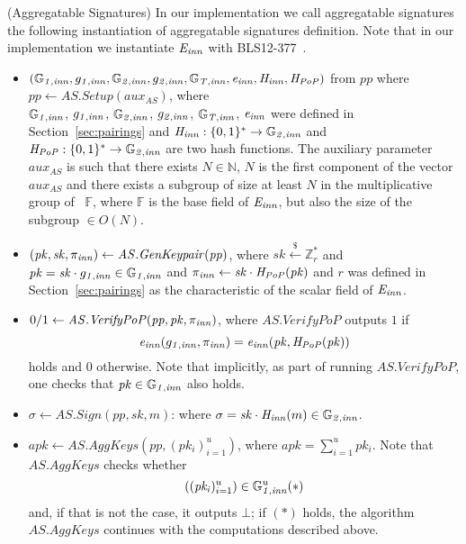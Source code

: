 \begin{construction}(Aggregatable Signatures) 
\label{insta:bls}
In our implementation we call aggregatable signatures the following 
instantiation of aggregatable signatures definition. Note that in our implementation we instantiate $\mathit{E}_{\mathit{inn}}$ with BLS12-377~\cite{zexe}.
\begin{itemize}
\item $(\mathbb{G}_{\mathit{1,inn}}, g_{\mathit{1,inn}}, \mathbb{G}_{\mathit{2,inn}}, g_{\mathit{2,inn}}, \mathbb{G}_{\mathit{T,inn}}, \mathit{e}_{\mathit{inn}}, \mathit{H}_{\mathit{inn}}, \mathit{H}_{\mathit{PoP}})$ from $\mathit{pp}$ where 
$\mathit{pp} \leftarrow  \mathit{AS.Setup}(\mathit{aux_{\mathit{AS}}})$, 
where \\ $\mathbb{G}_{\mathit{1,inn}}$, $g_{\mathit{1,inn}}$, $\mathbb{G}_{\mathit{2,inn}}$, $g_{\mathit{2,inn}}$, $\mathbb{G}_{\mathit{T,inn}}$, $\mathit{e}_{\mathit{inn}}$ were defined in Section~\ref{sec:pairings} and 
$\mathit{H}_{\mathit{inn}}: \{0,1\}^* \rightarrow \mathbb{G}_{\mathit{2,inn}}$ and $\mathit{H}_{\mathit{PoP}}: \{0,1\}^* \rightarrow \mathbb{G}_{\mathit{2,inn}}$ are two hash functions. 
The auxiliary parameter $\mathit{aux_{\mathit{AS}}}$ is such that there exists $N \in \mathbb{N}$, 
$N$ is the first component of the vector $\mathit{aux_{\mathit{AS}}}$ and there exists a subgroup of size at least $N$ in the multiplicative group 
of \ $\mathbb{F}$, where $\mathbb{F}$ is the base field of $\mathit{E}_{\mathit{inn}}$, but also the size of the subgroup $\in O(N)$.

\item $(\mathit{pk},\mathit{sk}, \pi_{\mathit{inn}}) \leftarrow \mathit{AS.GenKeypair}(\mathit{pp})$, where $\mathit{sk} \xleftarrow{\$} \mathbb{Z}_{r}^{*}$  
and $\mathit{pk} = \mathit{sk} \cdot g_{\mathit{1,inn}} \in \mathbb{G}_{\mathit{1,inn}}$ and $\pi_{\mathit{inn}} \leftarrow {\mathit{sk}} \cdot \mathit{H}_{\mathit{PoP}}(\mathit{pk})$ 
and $r$ was defined in Section~\ref{sec:pairings} as the characteristic of the scalar field of $\mathit{E}_{\mathit{inn}}$.

\item $0/1 \leftarrow \mathit{AS.VerifyPoP}(\mathit{pp}, \mathit{pk}, \pi_{\mathit{inn}})$, where $\mathit{AS.VerifyPoP}$ outputs $1$ if 
$$\mathit{e}_{\mathit{inn}}( g_{\mathit{1,inn}}, \pi_{\mathit{inn}}) = \mathit{e}_{\mathit{inn}}(\mathit{pk}, \mathit{H}_{\mathit{PoP}}(\mathit{pk}))$$ holds and $0$ otherwise. Note that implicitly, as part of running 
$\mathit{AS.VerifyPoP}$, one checks that $\mathit{pk} \in \mathbb{G}_{\mathit{1,inn}}$ also holds.

\item $\sigma \leftarrow \mathit{AS.Sign}(\mathit{pp}, \mathit{sk}, m)$: 
where $\sigma = \mathit{sk} \cdot \mathit{H}_{\mathit{inn}}(m) \in \mathbb{G}_{\mathit{2,inn}}$.

\item $\mathit{apk} \leftarrow \mathit{AS.AggKeys}(\mathit{pp}, (\mathit{pk_i})_{i=1}^{u})$, where  $\mathit{apk} = \sum_{i=1}^{u} \mathit{pk_i}$. 
Note that $\mathit{AS.AggKeys}$ checks whether $$((\mathit{pk_i})_{i=1}^{u}) \in \mathbb{G}_{\mathit{1,inn}}^{u} (\ast)$$ and, if that is not the case, it outputs $\bot$; 
if $(\ast)$ holds, the algorithm $\mathit{AS.AggKeys}$ continues with the computations described above. 



\end{itemize}
\end{construction}
